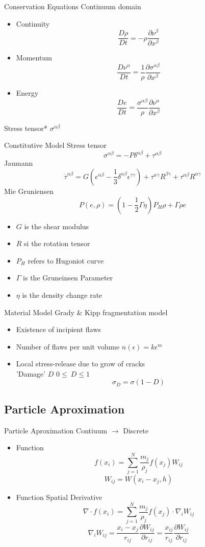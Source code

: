 \documentclass[10pt]{beamer}
\begin{document}
\begin{frame}{Conservation Equations}
Continuum domain
\begin{itemize}
\item Continuity
\[\frac{D\rho}{Dt}=-\rho\frac{\partial \nu^\beta}{\partial x^\beta}\]
\item Momentum
\[\frac{D\nu^\alpha}{Dt}=\frac{1}{\rho}\frac{\partial\sigma^{\alpha\beta}}{\partial x^\beta}\]
\item Energy
\[\frac{De}{Dt}=\frac{\sigma^{\alpha\beta}}{\rho}\frac{\partial\nu^\alpha}{\partial x^\beta}\]
\end{itemize}
Stress tensor* $\sigma^{\alpha\beta}$
\end{frame}

\begin{frame}{Constitutive Model}
Stress tensor
\[\sigma^{\alpha\beta}=-P\delta^{\alpha\beta}+\tau^{\alpha\beta}\]
Jaumann
\[\dot{\tau}^{\alpha\beta}=G\left(\epsilon^{\alpha\beta}-\frac{1}{3}\delta^{\alpha\beta}\epsilon^{\gamma\gamma}\right)+\tau^{\alpha\gamma}R^{\beta\gamma} + \tau^{\alpha\beta}R^{\alpha\gamma}\]
Mie Gruniensen
\[P(e,\rho)=\left(1-\frac{1}{2}\Gamma\eta\right)P_H\rho+\Gamma\rho e\]
\begin{itemize}
\item $G$ is the shear modulus
\item $R$ si the rotation tensor
\item $P_H$ refers to Hugoniot curve
\item $\Gamma$ is the Gruneinsen Parameter
\item $\eta$ is the density change rate
\end{itemize}
\end{frame}

\begin{frame}{Material Model}
Grady \& Kipp fragmentation model
\begin{itemize}
\item Existence of incipient flaws
\item Number of flaws per unit volume $n(\epsilon)=k\epsilon^m$
\item Local stress-release due to grow of cracks\\
'Damage' $D$ $0\leq\ D \leq1$
\[\sigma_D=\sigma(1-D)\]
\end{itemize}
\end{frame}

\subsection{Particle Aproximation}
\begin{frame}{Particle Aproximation}
Contiuum $\to$ Discrete
\begin{itemize}
\item Function
\[f(x_i)=\sum_{j=1}^{N}{\frac{m_j}{\rho_j}f(x_j)W_{ij}}\]
\[W_{ij}=W(x_i-x_j,h)\]
\item Function Spatial Derivative
\[ \nabla\cdot f(x_i)=\sum_{j=1}^{N}{\frac{m_j}{\rho_j}f(x_j)\cdot\nabla_i W_{ij}}\]
\[\nabla_iW_{ij}=\frac{x_i-x_j}{r_{ij}}\frac{\partial W_{ij} }{\partial r_{ij}}=\frac{x_{ij}}{r_{ij}}\frac{\partial W_{ij}}{\partial r_{ij}}\]
\end{itemize}
\end{frame}
\end{document}
